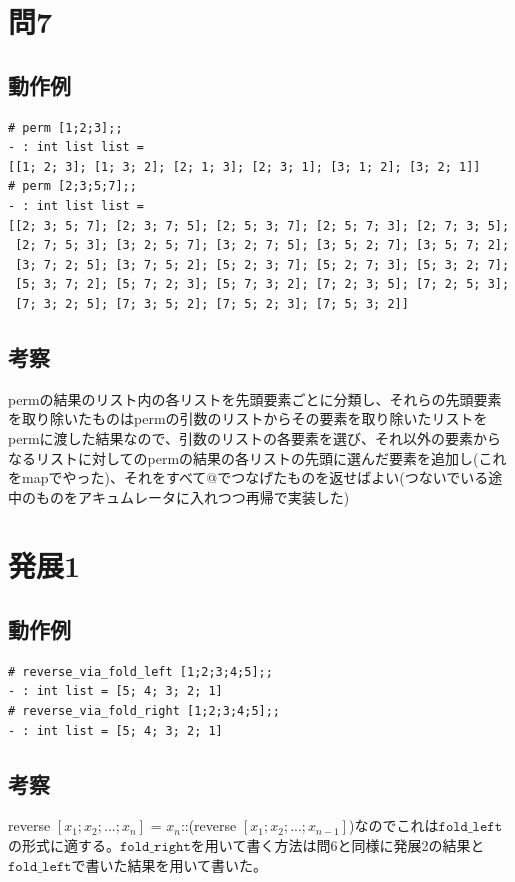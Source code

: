 \documentclass[11pt,a4paper]{jsarticle}
\begin{document}
\section*{問7}
\subsection*{動作例}
\begin{lstlisting}[basicstyle=\ttfamily\footnotesize, frame=single]
# perm [1;2;3];;
- : int list list =
[[1; 2; 3]; [1; 3; 2]; [2; 1; 3]; [2; 3; 1]; [3; 1; 2]; [3; 2; 1]]
# perm [2;3;5;7];;
- : int list list =
[[2; 3; 5; 7]; [2; 3; 7; 5]; [2; 5; 3; 7]; [2; 5; 7; 3]; [2; 7; 3; 5];
 [2; 7; 5; 3]; [3; 2; 5; 7]; [3; 2; 7; 5]; [3; 5; 2; 7]; [3; 5; 7; 2];
 [3; 7; 2; 5]; [3; 7; 5; 2]; [5; 2; 3; 7]; [5; 2; 7; 3]; [5; 3; 2; 7];
 [5; 3; 7; 2]; [5; 7; 2; 3]; [5; 7; 3; 2]; [7; 2; 3; 5]; [7; 2; 5; 3];
 [7; 3; 2; 5]; [7; 3; 5; 2]; [7; 5; 2; 3]; [7; 5; 3; 2]]
 \end{lstlisting}
\subsection*{考察}
permの結果のリスト内の各リストを先頭要素ごとに分類し、それらの先頭要素を取り除いたものはpermの引数のリストからその要素を取り除いたリストをpermに渡した結果なので、引数のリストの各要素を選び、それ以外の要素からなるリストに対してのpermの結果の各リストの先頭に選んだ要素を追加し(これをmapでやった)、それをすべて@でつなげたものを返せばよい(つないでいる途中のものをアキュムレータに入れつつ再帰で実装した)
\section*{発展1}
\subsection*{動作例}
\begin{lstlisting}[basicstyle=\ttfamily\footnotesize, frame=single]
# reverse_via_fold_left [1;2;3;4;5];;
- : int list = [5; 4; 3; 2; 1]
# reverse_via_fold_right [1;2;3;4;5];;
- : int list = [5; 4; 3; 2; 1]
 \end{lstlisting}
\subsection*{考察}
reverse $[x_1; x_2; ...;x_n]$ = $x_n$::(reverse $[x_1; x_2; ...;x_{n-1}]$)なのでこれは$\texttt{fold\_left}$の形式に適する。$\texttt{fold\_right}$を用いて書く方法は問6と同様に発展2の結果と$\texttt{fold\_left}$で書いた結果を用いて書いた。
\end{document}
